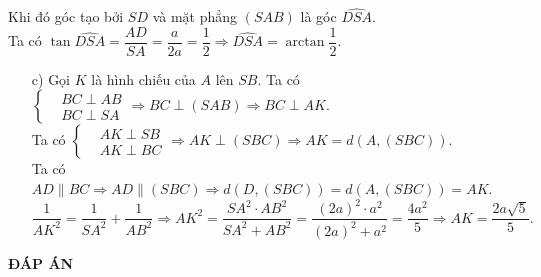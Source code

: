 \begin{bt}
{		Khi đó góc tạo bởi $SD$ và mặt phẳng $(SAB)$ là góc $\widehat{DSA}$.\\
		Ta có $\tan \widehat{DSA}=\dfrac{AD}{SA}=\dfrac{a}{2a}=\dfrac{1}{2}\Rightarrow \widehat{DSA}=\arctan \dfrac{1}{2}$.
		\begin{enumerate}
			\item[c)] Gọi $K$ là hình chiếu của $A$ lên $SB$. Ta có $\left \{ \begin{aligned} &BC\perp AB\\&BC\perp SA\end{aligned} \right.\Rightarrow BC\perp (SAB)\Rightarrow BC\perp AK.$\\
			Ta có $\left \{ \begin{aligned} &AK\perp SB\\ &AK\perp BC\end{aligned}\right. \Rightarrow AK\perp (SBC)\Rightarrow AK=d(A,(SBC))$.\\
			Ta có $AD\parallel BC\Rightarrow AD\parallel (SBC)\Rightarrow d(D,(SBC))=d(A,(SBC))=AK$.\\
			$\dfrac{1}{AK^2}=\dfrac{1}{SA^2}+\dfrac{1}{AB^2}\Rightarrow AK^2=\dfrac{SA^2\cdot AB^2}{SA^2+AB^2}=\dfrac{(2a)^2\cdot a^2}{(2a)^2+a^2}=\dfrac{4a^2}{5}\Rightarrow AK=\dfrac{2a\sqrt{5}}{5}.$
		\end{enumerate}
	}
\end{bt}


\newpage
\begin{center}
	\textbf{ĐÁP ÁN}
\end{center}
\begin{multicols}{10}
	
\end{multicols}

